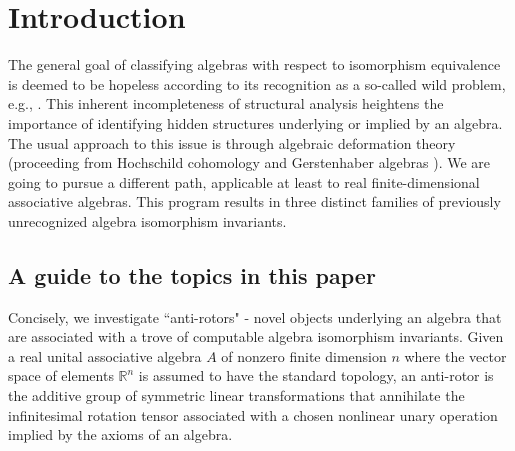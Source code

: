 \documentclass{amsart}
\numberwithin{equation}{section}
\theoremstyle{definition}
\numberwithin{theorem}{section}
\begin{document}
 \tableofcontents
 
 \section{Introduction} The general goal of classifying algebras with respect to isomorphism equivalence is deemed to be hopeless according to its recognition as a so-called wild problem, e.g., \cite{eom:2024,drozd:1972,belitskii:2005}.   This inherent incompleteness of structural analysis heightens the importance of identifying hidden structures underlying or implied by an algebra.  The usual approach to this issue is through algebraic deformation theory (proceeding from Hochschild \mbox{cohomology} and Gerstenhaber algebras \cite{hochschild:1945,gerstenhaber:1964}).  We are going to pursue a different path, applicable at least to real finite-dimensional associative algebras.  This program results in three distinct families of previously unrecognized algebra isomorphism invariants.
 
\subsection{A guide to the topics in this paper} 
Concisely, we investigate ``anti-rotors" -  novel objects underlying an algebra that are associated with a trove of computable algebra isomorphism invariants.
Given a real unital associative algebra $A$ of nonzero finite dimension $n$ where the vector space of elements $\mathbb{R}^n$ is assumed to have the standard topology, an \mbox{anti-rotor} is the additive group of symmetric linear transformations that annihilate the infinitesimal rotation tensor associated with a chosen nonlinear unary operation implied by the axioms of an algebra.  
\end{document}
